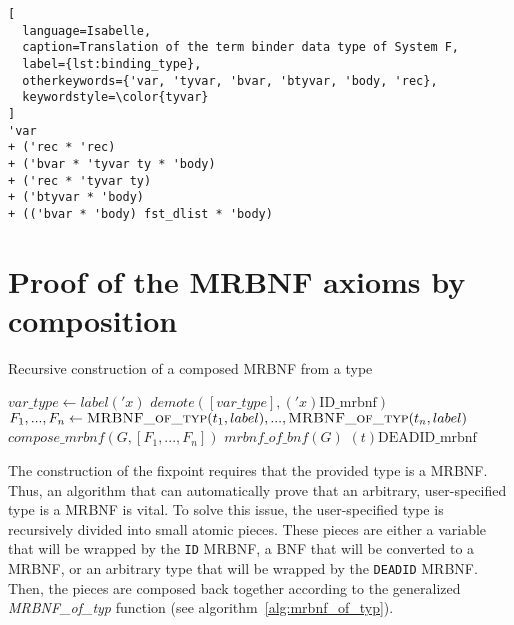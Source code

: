 \begin{lstlisting}[
  language=Isabelle,
  caption=Translation of the term binder data type of System F,
  label={lst:binding_type},
  otherkeywords={'var, 'tyvar, 'bvar, 'btyvar, 'body, 'rec},
  keywordstyle=\color{tyvar}
]
'var
+ ('rec * 'rec)
+ ('bvar * 'tyvar ty * 'body)
+ ('rec * 'tyvar ty)
+ ('btyvar * 'body)
+ (('bvar * 'body) fst_dlist * 'body)
\end{lstlisting}

\section{Proof of the \acs{MRBNF} axioms by composition}\label{sec:mrbnf_of_typ}

\begin{algorithm}
\caption{Recursive construction of a composed \ac{MRBNF} from a type}\label{alg:mrbnf_of_typ}
\begin{algorithmic}[1]
    \State $\textit{var\_type}\gets label('x)$ \Comment{\textcolor{darkgreen}{is $'x$ Live, Free, Bound or Dead?}}
    \State \Return $\textit{demote}([\textit{var\_type}], ('x)\text{ID\_mrbnf})$
    \State $F_1,...,F_n\gets \Call{MRBNF\_of\_typ}{t_1, label},...,\Call{MRBNF\_of\_typ}{t_n, label}$
    \State \Return $\textit{compose\_mrbnf}(G, [F_1,...,F_n])$
    \State $\textit{mrbnf\_of\_bnf}(G)$ \Comment{\textcolor{darkgreen}{Convert G to a MRBNF and register it for future use}}
    \State \Return {}
  \Else
    \State \Return $(t)\text{DEADID\_mrbnf}$
  \EndIf
\EndFunction
\end{algorithmic}
\end{algorithm}

The construction of the fixpoint requires that the provided type is a \ac{MRBNF}. Thus, an algorithm that can automatically prove that an arbitrary, user-specified type is a \ac{MRBNF} is vital. To solve this issue, the user-specified type is recursively divided into small atomic pieces. These pieces are either a variable that will be wrapped by the \texttt{ID} \ac{MRBNF}, a \ac{BNF} that will be converted to a \ac{MRBNF}, or an arbitrary type that will be wrapped by the \texttt{DEADID} \ac{MRBNF}. Then, the pieces are composed back together according to the generalized \textit{MRBNF\_of\_typ} function (see algorithm~\ref{alg:mrbnf_of_typ}).

